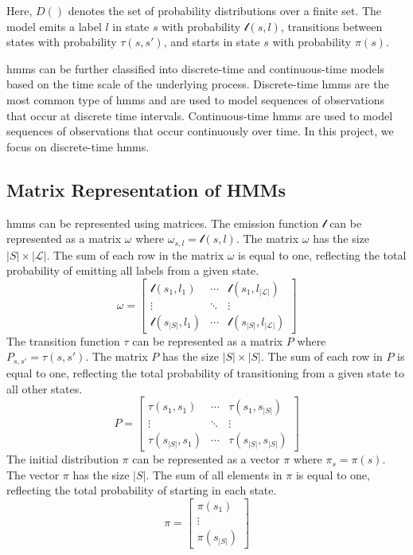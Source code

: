 Here, $D()$ denotes the set of probability distributions over a finite set. The model emits a label $l$ in state $s$ with probability $\mathscr{l}(s, l)$, transitions between states with probability $\tau(s, s')$, and starts in state $s$ with probability $\pi(s)$.

\glspl{hmm} can be further classified into discrete-time and continuous-time models based on the time scale of the underlying process.
Discrete-time \glspl{hmm} are the most common type of \glspl{hmm} and are used to model sequences of observations that occur at discrete time intervals.
Continuous-time \glspl{hmm} are used to model sequences of observations that occur continuously over time.
In this project, we focus on discrete-time \glspl{hmm}.

\subsection{Matrix Representation of HMMs}\label{subsec:matrix-representation}
\glspl{hmm} can be represented using matrices.
The emission function $\mathscr{l}$ can be represented as a matrix $\omega$ where $\omega_{s, l} = \mathscr{l}(s, l)$.
The matrix $\omega$ has the size $|S| \times |\mathcal{L}|$.
The sum of each row in the matrix $\omega$ is equal to one, reflecting the total probability of emitting all labels from a given state.
\[
\omega = \begin{bmatrix}
    \mathscr{l}(s_1, l_1) & \cdots & \mathscr{l}(s_1, l_{|\mathcal{L}|}) \\
    \vdots & \ddots & \vdots \\
    \mathscr{l}(s_{|S|}, l_1)  & \cdots & \mathscr{l}(s_{|S|}, l_{|\mathcal{L}|})
\end{bmatrix}
\]
The transition function $\tau$ can be represented as a matrix $P$ where $P_{s, s'} = \tau(s, s')$.
The matrix $P$ has the size $|S| \times |S|$.
The sum of each row in $P$ is equal to one, reflecting the total probability of transitioning from a given state to all other states.
\[
P = \begin{bmatrix}
    \tau(s_1, s_1) &  \cdots & \tau(s_1, s_{|S|}) \\
    \vdots  & \ddots & \vdots \\
    \tau(s_{|S|}, s_1) & \cdots & \tau(s_{|S|}, s_{|S|})
\end{bmatrix}
\]
The initial distribution $\pi$ can be represented as a vector $\pi$ where $\pi_s = \pi(s)$.
The vector $\pi$ has the size $|S|$.
The sum of all elements in $\pi$ is equal to one, reflecting the total probability of starting in each state.
\[
\pi = \begin{bmatrix}
    \pi(s_1) \\
    \vdots \\
    \pi(s_{|S|})
\end{bmatrix} 
\]

